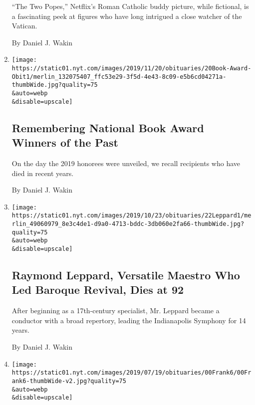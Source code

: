 \begin{enumerate}
  ``The Two Popes,'' Netflix's Roman Catholic buddy picture, while
  fictional, is a fascinating peek at figures who have long intrigued a
  close watcher of the Vatican.

  By Daniel J. Wakin
\item
  \href{/2019/11/20/books/remembering-national-book-award-winners-of-the-past.html}{}

  \texttt{[image: https://static01.nyt.com/images/2019/11/20/obituaries/20Book-Award-Obit1/merlin\_132075407\_ffc53e29-3f5d-4e43-8c09-e5b6cd04271a-thumbWide.jpg?quality=75\\\&auto=webp\\\&disable=upscale]}

  \hypertarget{remembering-national-book-award-winners-of-the-past}{%
  \subsection{Remembering National Book Award Winners of the
  Past}\label{remembering-national-book-award-winners-of-the-past}}

  On the day the 2019 honorees were unveiled, we recall recipients who
  have died in recent years.

  By Daniel J. Wakin
\item
  \href{/2019/10/22/arts/music/raymond-leppard-dead.html}{}

  \texttt{[image: https://static01.nyt.com/images/2019/10/23/obituaries/22Leppard1/merlin\_49060979\_8e3c4de1-d9a0-4713-bddc-3db060e2fa66-thumbWide.jpg?quality=75\\\&auto=webp\\\&disable=upscale]}

  \hypertarget{raymond-leppard-versatile-maestro-who-led-baroque-revival-dies-at-92}{%
  \subsection{Raymond Leppard, Versatile Maestro Who Led Baroque
  Revival, Dies at
  92}\label{raymond-leppard-versatile-maestro-who-led-baroque-revival-dies-at-92}}

  After beginning as a 17th-century specialist, Mr. Leppard became a
  conductor with a broad repertory, leading the Indianapolis Symphony
  for 14 years.

  By Daniel J. Wakin
\item
  \href{/2019/10/04/arts/what-they-left-behind.html}{}

  \texttt{[image: https://static01.nyt.com/images/2019/07/19/obituaries/00Frank6/00Frank6-thumbWide-v2.jpg?quality=75\\\&auto=webp\\\&disable=upscale]}

  \hypertarget{legacies-of-the-recently-departed-1}{%
}
\end{enumerate}
